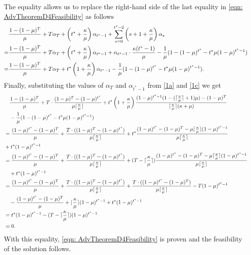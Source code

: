     
    The equality allows us to replace the right-hand side of the last equality in \ref{eqn: AdvTheoremD4Feasibility} as follows
    \begin{align*}
        & \frac{1- (1-\mu)^T}{\mu} + T\alpha_T + \left(t^* + \frac{\kappa}{\mu} \right) \alpha_{t^*-1} + \sum_{s=0}^{t^*-2} \left(s+1+\frac{\kappa}{\mu} \right) \alpha_s\\
         = &  \frac{1- (1-\mu)^T}{\mu} + T\alpha_T + \left(t^* + \frac{\kappa}{\mu} \right) \alpha_{t^*-1} + \alpha_{t^*-1} \cdot \frac{\kappa(t^*-1)}{\mu} - \frac{1}{\mu} (1 - (1-\mu)^{t^*} - t^* \mu (1-\mu)^{t^*-1})\\
        = & \frac{1- (1-\mu)^T}{\mu} + T\alpha_T + t^* \left(1 + \frac{\kappa}{\mu} \right) \alpha_{t^*-1}  - \frac{1}{\mu} (1 - (1-\mu)^{t^*} - t^* \mu (1-\mu)^{t^*-1}).
    \end{align*}
    Finally, substituting the values of $\alpha_T$ and $\alpha_{t^*-1}$ from \eqref{1a} and \eqref{1c} we get
    \begin{align*}
        &\quad \frac{1- (1-\mu)^T}{\mu} + T \cdot \frac{(1-\mu)^T - (1-\mu)^{t^*}}{\mu \lceil \frac{\kappa}{\mu} \rceil} + t^* \left( 1 + \frac{\kappa}{\mu} \right) \frac{(1-\mu)^{t^*-1} (1 - (\lceil \frac{\kappa}{\mu} \rceil+1)\mu) - (1-\mu)^T }{\lceil \frac{\kappa}{\mu} \rceil (\kappa +\mu)} \\
        &\quad - \frac{1}{\mu} (1 - (1-\mu)^{t^*} - t^* \mu (1-\mu)^{t^*-1})\\
        &= \frac{(1-\mu)^{t^*} - (1-\mu)^T}{\mu} +  \frac{T \cdot((1-\mu)^T - (1-\mu)^{t^*})}{\mu \lceil \frac{\kappa}{\mu} \rceil} + t^* \frac{ (1-\mu)^{t^*} - (1-\mu)^T - \mu \lceil \frac{\kappa}{\mu} \rceil (1-\mu)^{t^*-1} }{\mu \lceil \frac{\kappa}{\mu} \rceil}\\
        &+ t^* (1-\mu)^{t^*-1}\\
        &= \frac{(1-\mu)^{t^*} - (1-\mu)^T}{\mu} +  \frac{T \cdot((1-\mu)^T - (1-\mu)^{t^*})}{\mu \lceil \frac{\kappa}{\mu} \rceil} + (T - \lceil \frac{\kappa}{\mu} \rceil) \frac{ (1-\mu)^{t^*} - (1-\mu)^T - \mu \lceil \frac{\kappa}{\mu} \rceil (1-\mu)^{t^*-1}}{\mu \lceil \frac{\kappa}{\mu} \rceil} \\
        & \quad + t^* (1-\mu)^{t^*-1}\\
        &= \frac{(1-\mu)^{t^*} - (1-\mu)^T}{\mu} +  \frac{T \cdot((1-\mu)^T - (1-\mu)^{t^*})}{\mu \lceil \frac{\kappa}{\mu} \rceil} + \frac{T \cdot((1-\mu)^{t^*} - (1-\mu)^T)}{\mu \lceil \frac{\kappa}{\mu} \rceil} - T (1-\mu)^{t^* - 1} \\
        &\quad - \frac{(1-\mu)^{t^*} - (1-\mu)^T}{\mu} + \lceil \frac{\kappa}{\mu} \rceil (1-\mu)^{t^* - 1} + t^* (1-\mu)^{t^* - 1}\\
        &= t^* (1-\mu)^{t^* - 1} - (T - \lceil \frac{\kappa}{\mu} \rceil)(1-\mu)^{t^* - 1}\\
        &= 0.
    \end{align*}
    With this equality, \ref{eqn: AdvTheoremD4Feasibility} is proven and the feasibility of the solution follows.

